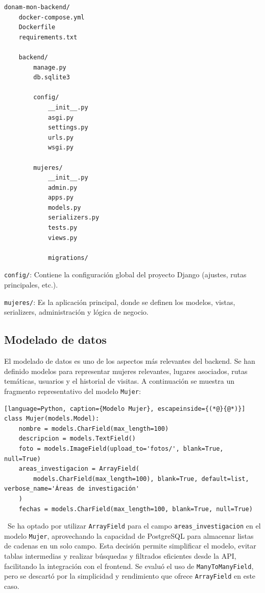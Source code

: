 \begin{lstlisting}[language=bash, caption={Estructura principal del backend}]
donam-mon-backend/
    docker-compose.yml
    Dockerfile
    requirements.txt

    backend/
        manage.py
        db.sqlite3

        config/
            __init__.py
            asgi.py
            settings.py
            urls.py
            wsgi.py

        mujeres/
            __init__.py
            admin.py
            apps.py
            models.py
            serializers.py
            tests.py
            views.py

            migrations/
\end{lstlisting}

\texttt{config/}: Contiene la configuración global del proyecto Django (ajustes, rutas principales, etc.).

\texttt{mujeres/}: Es la aplicación principal, donde se definen los modelos, vistas, serializers, administración y lógica de negocio.

\subsection{Modelado de datos}

El modelado de datos es uno de los aspectos más relevantes del backend. Se han definido modelos para representar mujeres relevantes, lugares asociados, rutas temáticas, usuarios y el historial de visitas. A continuación se muestra un fragmento representativo del modelo \texttt{Mujer}:

\begin{lstlisting}[language=Python, caption={Modelo Mujer}, escapeinside={(*@}{@*)}]
class Mujer(models.Model):
    nombre = models.CharField(max_length=100)
    descripcion = models.TextField()
    foto = models.ImageField(upload_to='fotos/', blank=True, null=True)
    areas_investigacion = ArrayField(
        models.CharField(max_length=100), blank=True, default=list, verbose_name='Áreas de investigación'
    )
    fechas = models.CharField(max_length=100, blank=True, null=True)
\end{lstlisting}

\
Se ha optado por utilizar \texttt{ArrayField} para el campo \texttt{areas\_investigacion} en el modelo \texttt{Mujer}, aprovechando la capacidad de PostgreSQL para almacenar listas de cadenas en un solo campo. Esta decisión permite simplificar el modelo, evitar tablas intermedias y realizar búsquedas y filtrados eficientes desde la API, facilitando la integración con el frontend. Se evaluó el uso de \texttt{ManyToManyField}, pero se descartó por la simplicidad y rendimiento que ofrece \texttt{ArrayField} en este caso.


